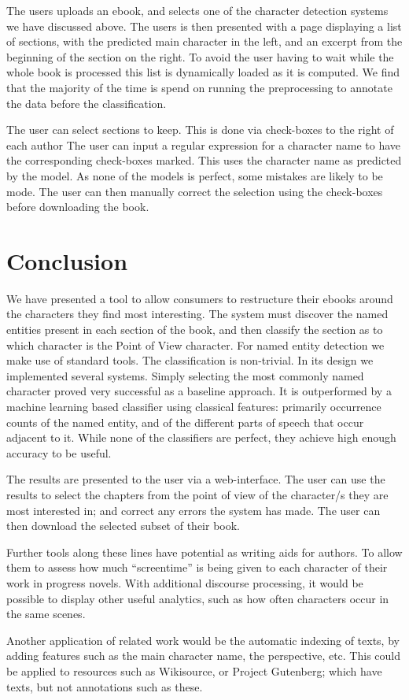 \documentclass[11pt,a4paper]{article}
\begin{document}
The users uploads an ebook, and selects one of the character detection systems we have discussed above.
The users is then presented with a page displaying a list of sections,
with the predicted main character in the left, and an excerpt from the beginning of the section on the right.
To avoid the user having to wait while the whole book is processed this list is dynamically loaded as it is computed.
We find that the majority of the time is spend on running the preprocessing to annotate the data before the classification.

The user can select sections to keep.
This is done via check-boxes to the right of each author
The user can input a regular expression for a character name to have the corresponding check-boxes marked.
This uses the character name as predicted by the model.
As none of the models is perfect, some mistakes are likely to be mode.
The user can then manually correct the selection using the check-boxes before downloading the book.




\section{Conclusion}\label{sec:conclusion}
We have presented a tool to allow consumers to restructure their ebooks around the characters they find most interesting.
The system must discover the named entities present in each section of the book,
and then classify the section as to which character is the Point of View character.
For named entity detection we make use of standard tools.
The classification is non-trivial.
In its design we implemented several systems.
Simply selecting the most commonly named character proved very successful as a baseline approach.
It is outperformed by a machine learning based classifier using classical features: primarily occurrence counts of the named entity, and of the different parts of speech that occur adjacent to it.
While none of the classifiers are perfect,
they achieve high enough accuracy to be useful.

The results are presented to the user via a web-interface.
The user can use the results to select the chapters from the point of view of the character/s they are most interested in;
and correct any errors the system has made.
The user can then download the selected subset of their book.


Further tools along these lines have potential as writing aids for authors.
To allow them to assess how much ``screentime'' is being given to each character of their work in progress novels.
With additional discourse processing, it would be possible to display other useful analytics, such as how often characters occur in the same scenes.

Another application of related work would be the automatic indexing of texts, by adding features such as the main character name, the perspective, etc.
This could be applied to resources such as Wikisource, or Project Gutenberg;
which have texts, but not annotations such as these.




\clearpage

\end{document}
